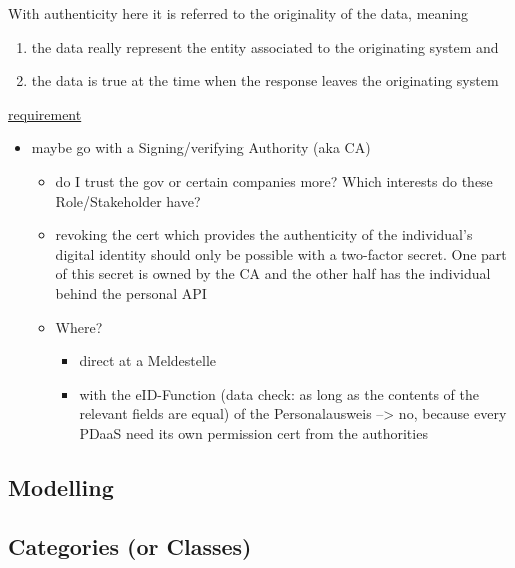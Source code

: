 \documentclass[12pt,english,a4paper,titlepage,cleardoublepage=empty,dottedtoc]{report}
\providecommand{\tightlist}{%
  \setlength{\itemsep}{0pt}\setlength{\parskip}{0pt}}
\begin{document}
With authenticity here it is referred to the originality of the data,
meaning

\begin{enumerate}
\def\labelenumi{(\Alph{enumi})}
\tightlist
\item
  the data really represent the entity associated to the originating
  system and
\item
  the data is true at the time when the response leaves the originating
  system
\end{enumerate}

\protect\hyperlink{sa04}{requirement}

\begin{itemize}
\tightlist
\item
  maybe go with a Signing/verifying Authority (aka CA)

  \begin{itemize}
  \tightlist
  \item
    do I trust the gov or certain companies more? Which interests do
    these Role/Stakeholder have?
  \item
    revoking the cert which provides the authenticity of the
    individual's digital identity should only be possible with a
    two-factor secret. One part of this secret is owned by the CA and
    the other half has the individual behind the personal API
  \item
    Where?

    \begin{itemize}
    \tightlist
    \item
      direct at a Meldestelle
    \item
      with the eID-Function (data check: as long as the contents of the
      relevant fields are equal) of the Personalausweis --\textgreater{}
      no, because every PDaaS need its own permission cert from the
      authorities
    \end{itemize}
  \end{itemize}
\end{itemize}

\subsection{Modelling}\label{modelling}

\subsection{Categories (or Classes)}\label{categories-or-classes}
\end{document}

